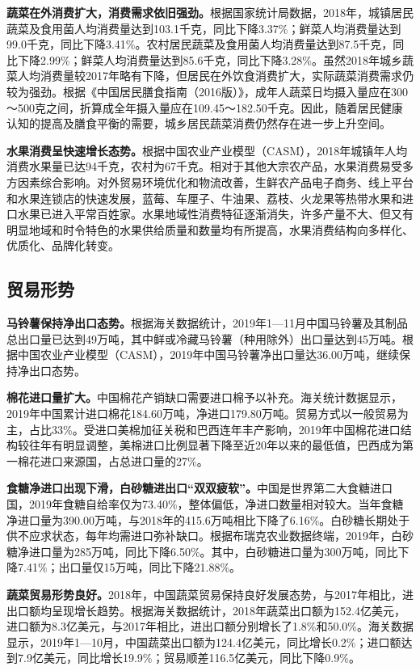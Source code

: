 \documentclass{progbookcn}
\begin{document}
\textbf{蔬菜在外消费扩大，消费需求依旧强劲。}根据国家统计局数据，2018年，城镇居民蔬菜及食用菌人均消费量达到103.1千克，同比下降3.37\%；鲜菜人均消费量达到99.0千克，同比下降3.41\%。农村居民蔬菜及食用菌人均消费量达到87.5千克，同比下降2.99\%；鲜菜人均消费量达到85.6千克，同比下降3.28\%。虽然2018年城乡蔬菜人均消费量较2017年略有下降，但居民在外饮食消费扩大，实际蔬菜消费需求仍较为强劲。根据《中国居民膳食指南（2016版）》，成年人蔬菜日均摄入量应在300～500克之间，折算成全年摄入量应在109.45～182.50千克。因此，随着居民健康认知的提高及膳食平衡的需要，城乡居民蔬菜消费仍然存在进一步上升空间。

\textbf{水果消费呈快速增长态势。}根据中国农业产业模型（CASM），2018年城镇年人均消费水果量已达94千克，农村为67千克。相对于其他大宗农产品，水果消费易受多方因素综合影响。对外贸易环境优化和物流改善，生鲜农产品电子商务、线上平台和水果连锁店的快速发展，蓝莓、车厘子、牛油果、荔枝、火龙果等热带水果和进口水果已进入平常百姓家。水果地域性消费特征逐渐消失，许多产量不大、但又有明显地域和时令特色的水果供给质量和数量均有所提高，水果消费结构向多样化、优质化、品牌化转变。

\subsection{贸易形势}
\textbf{马铃薯保持净出口态势。}根据海关数据统计，2019年1—11月中国马铃薯及其制品总出口量已达到49万吨，其中鲜或冷藏马铃薯（种用除外）出口量达到45万吨。根据中国农业产业模型（CASM），2019年中国马铃薯净出口量达36.00万吨，继续保持净出口态势。

\textbf{棉花进口量扩大。}中国棉花产销缺口需要进口棉予以补充。海关统计数据显示，2019年中国累计进口棉花184.60万吨，净进口179.80万吨。贸易方式以一般贸易为主，占比33\%。受进口美棉加征关税和巴西连年丰产影响，2019年中国棉花进口结构较往年有明显调整，美棉进口比例显著下降至近20年以来的最低值，巴西成为第一棉花进口来源国，占总进口量的27\%。

\textbf{食糖净进口出现下滑，白砂糖进出口“双双疲软”。}中国是世界第二大食糖进口国，2019年食糖自给率仅为73.40\%，整体偏低，净进口数量相对较大。当年食糖净进口量为390.00万吨，与2018年的415.6万吨相比下降了6.16\%。白砂糖长期处于供不应求状态，每年均需进口弥补缺口。根据布瑞克农业数据终端，2019年，白砂糖净进口量为285万吨，同比下降6.50\%。其中，白砂糖进口量为300万吨，同比下降7.41\%；出口量仅15万吨，同比下降21.88\%。

\textbf{蔬菜贸易形势良好。}2018年，中国蔬菜贸易保持良好发展态势，与2017年相比，进出口额均呈现增长趋势。根据海关数据统计，2018年蔬菜出口额为152.4亿美元，进口额为8.3亿美元，与2017年相比，进出口额分别增长了1.8\%和50.0\%。海关数据显示，2019年1—10月，中国蔬菜出口额为124.4亿美元，同比增长0.2\%；进口额达到7.9亿美元，同比增长19.9\%；贸易顺差116.5亿美元，同比下降0.9\%。
\end{document}
